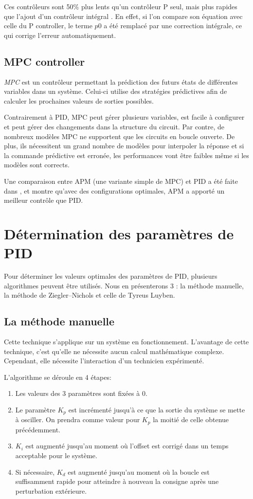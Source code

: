 \documentclass[a4paper,10pt]{report}
\begin{document}
Ces contrôleurs sont 50\% plus lents qu'un contrôleur P seul, mais plus rapides que l'ajout d'un contrôleur intégral \cite{svrcek2006real}.
En effet, si l'on compare son équation avec celle du P controller, le terme $p0$ a été remplacé par une correction intégrale, ce qui corrige l'erreur automatiquement.

\subsection{MPC controller}
\emph{MPC} est un contrôleur permettant la prédiction des futurs états de différentes variables dans un système.
Celui-ci utilise des stratégies prédictives afin de calculer les prochaines valeurs de sorties possibles.

Contrairement à PID, MPC peut gérer plusieurs variables, est facile à configurer et peut gérer des changements dans la structure du circuit.
Par contre, de nombreux modèles MPC ne supportent que les circuits en boucle ouverte.
De plus, ils nécessitent un grand nombre de modèles pour interpoler la réponse et si la commande prédictive est erronée, les performances vont être faibles même si les modèles sont corrects.

Une comparaison entre APM (une variante simple de MPC) et PID a été faite dans \cite{saletovic2014apm}, et montre qu'avec des configurations optimales, APM a apporté un meilleur contrôle que PID.

\section{Détermination des paramètres de PID}


Pour déterminer les valeurs optimales des paramètres de PID, plusieurs algorithmes peuvent être utilisés. Nous en présenterons 3 : la méthode manuelle, la méthode de Ziegler–Nichols et celle de Tyreus Luyben.

\subsection{La méthode manuelle}
Cette technique s'applique sur un système en fonctionnement.
L'avantage de cette technique, c'est qu'elle ne nécessite aucun calcul mathématique complexe.
Cependant, elle nécessite l'interaction d'un technicien expérimenté.

L'algorithme se déroule en 4 étapes:
\begin{enumerate}
    \item Les valeurs des 3 paramètres sont fixées à $0$.
    \item Le paramètre $K_p$ est incrémenté jusqu'à ce que la sortie du système se mette à osciller.
    On prendra comme valeur pour $K_p$ la moitié de celle obtenue précédemment.
    \item $K_i$ est augmenté jusqu'au moment où l'offset est corrigé dans un temps acceptable pour le système.
    \item Si nécessaire, $K_d$ est augmenté jusqu'au moment où la boucle est suffisamment rapide pour atteindre à nouveau la consigne après une perturbation extérieure.
\end{enumerate}
\end{document}
